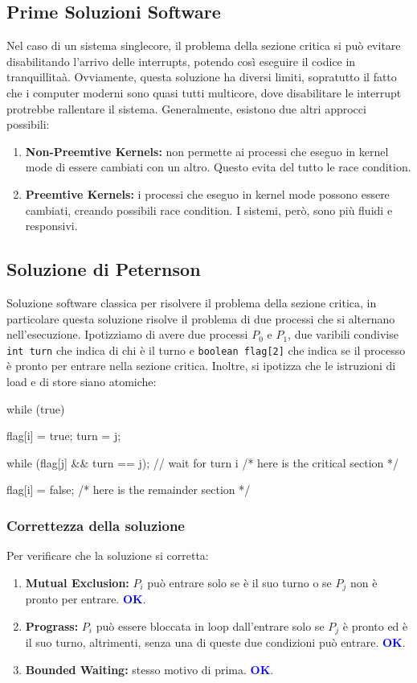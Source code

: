\subsection{Prime Soluzioni Software}
Nel caso di un sistema singlecore, il problema della sezione critica si può evitare disabilitando l'arrivo delle interrupts, potendo così eseguire il codice in tranquillitaà. 
Ovviamente, questa soluzione ha diversi limiti, sopratutto il fatto che i computer moderni sono quasi tutti multicore, dove disabilitare le interrupt protrebbe rallentare il sistema.
Generalmente, esistono due altri approcci possibili:
\begin{enumerate}
  \item \textbf{Non-Preemtive Kernels:} non permette ai processi che eseguo in kernel mode di essere cambiati con un altro. Questo evita del tutto le race condition.
  \item \textbf{Preemtive Kernels:} i processi che eseguo in kernel mode possono essere cambiati, creando possibili race condition. I sistemi, però, sono più fluidi e responsivi.
\end{enumerate}

\subsection{Soluzione di Peternson}
Soluzione software classica per risolvere il problema della sezione critica, in particolare questa soluzione risolve il problema di due processi che si alternano nell'esecuzione.
Ipotizziamo di avere due processi $P_0$ e $P_1$, due varibili condivise \texttt{int turn} che indica di chi è il turno e \texttt{boolean flag[2]} che indica se il processo è pronto per entrare nella sezione critica. 
Inoltre, si ipotizza che le istruzioni di load e di store siano atomiche:

\begin{clang}
while (true){
  flag[i] = true;
  turn = j;
  
  while (flag[j] && turn == j){}; // wait for turn i
    /* here is the critical section */
  
  flag[i] = false;
  /* here is the remainder section */
}
\end{clang}

\subsubsection{Correttezza della soluzione}
Per verificare che la soluzione si corretta:
\begin{enumerate}
  \item \textbf{Mutual Exclusion:} $P_i$ può entrare solo se è il suo turno o se $P_j$ non è pronto per entrare. \textcolor{blue}{\textbf{OK}}.
  \item \textbf{Prograss:} $P_i$ può essere bloccata in loop dall'entrare solo se $P_j$ è pronto ed è il suo turno, altrimenti, senza una di queste due condizioni può entrare. \textcolor{blue}{\textbf{OK}}.
  \item \textbf{Bounded Waiting:} stesso motivo di prima. \textcolor{blue}{\textbf{OK}}.
\end{enumerate}

